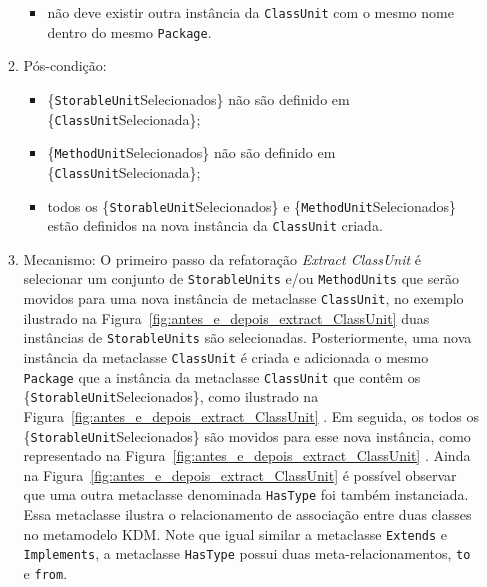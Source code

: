 \begin{enumerate}
\begin{enumerate}
\begin{itemize}
			        \item não deve existir outra instância da \texttt{ClassUnit} com o mesmo nome dentro do mesmo \texttt{Package}.
			    \end{itemize}
			\item Pós-condição:
			    \begin{itemize}
			        \item \{\texttt{StorableUnit}Selecionados\} não são definido em \{\texttt{ClassUnit}Selecionada\};
			        \item \{\texttt{MethodUnit}Selecionados\} não são definido em \{\texttt{ClassUnit}Selecionada\};
			        \item todos os \{\texttt{StorableUnit}Selecionados\} e \{\texttt{MethodUnit}Selecionados\} estão definidos na nova instância da \texttt{ClassUnit} criada.
			    \end{itemize}
			\item Mecanismo: O primeiro passo da refatoração \textit{Extract ClassUnit} é selecionar um conjunto de \texttt{StorableUnits} e/ou \texttt{MethodUnits} que serão movidos para uma nova instância de metaclasse \texttt{ClassUnit}, no exemplo ilustrado na Figura~\ref{fig:antes_e_depois_extract_ClassUnit}  duas instâncias de \texttt{StorableUnits} são selecionadas. Posteriormente, uma nova instância da metaclasse \texttt{ClassUnit} é criada e adicionada o mesmo \texttt{Package} que a instância da metaclasse \texttt{ClassUnit} que contêm os \{\texttt{StorableUnit}Selecionados\}, como ilustrado na Figura~\ref{fig:antes_e_depois_extract_ClassUnit} . Em seguida, os todos os \{\texttt{StorableUnit}Selecionados\} são movidos para esse nova instância, como representado na Figura~\ref{fig:antes_e_depois_extract_ClassUnit} . Ainda na Figura~\ref{fig:antes_e_depois_extract_ClassUnit}  é possível observar que uma outra metaclasse denominada \texttt{HasType} foi também instanciada. Essa metaclasse ilustra o relacionamento de associação entre duas classes no metamodelo KDM. Note que igual similar a metaclasse \texttt{Extends} e \texttt{Implements}, a metaclasse \texttt{HasType} possui duas meta-relacionamentos, \texttt{to} e \texttt{from}.
\begin{minipage}{.90\textwidth}
	\vspace*{\fill}
  \centering

\end{minipage}
\end{enumerate}
\end{enumerate}
